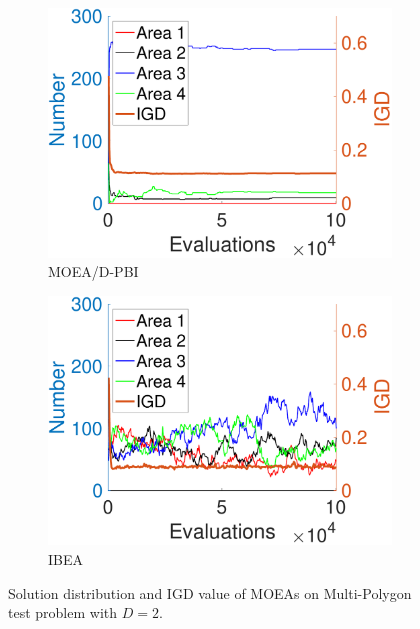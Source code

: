\documentclass[conference]{IEEEtran}
\begin{document}
\begin{figure}[htbp]
    \begin{subfigure}[b]{.22\textwidth}
    \includegraphics[width=\linewidth]{Section5/dim2/Diversity/MOEAD_PBI}
    \caption{MOEA/D-PBI}
    \label{fig: MOEA/D-PBI Diversity dim=2}
    \end{subfigure}
    \begin{subfigure}[b]{.22\textwidth}
    \includegraphics[width=\linewidth]{Section5/dim2/Diversity/IBEA}
    \caption{IBEA}
    \end{subfigure}

    \caption{Solution distribution and IGD value of MOEAs on Multi-Polygon test problem with $D=2$.}
    \label{fig: MOEAs Diversity dim=2}
\end{figure}
\end{document}
